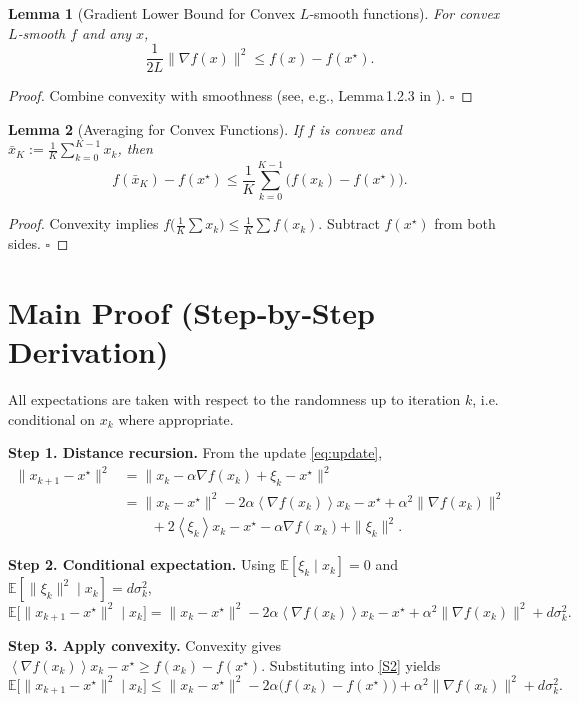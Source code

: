 \documentclass[11pt]{article}
\newtheorem{lemma}{Lemma}
\newcommand{\EE}{\mathbb{E}}
\newcommand{\inner}[1]{\left\langle #1\right\rangle}
\begin{document}
\begin{lemma}[Gradient Lower Bound for Convex $L$‑smooth functions]\label{lem:grad-bound}
For convex $L$‑smooth $f$ and any $x$,
\[
\frac{1}{2L}\|\nabla f(x)\|^{2}\le f(x)-f(x^{\star}).
\tag{L2}
\]
\end{lemma}
\begin{proof}
Combine convexity with smoothness (see, e.g., Lemma 1.2.3 in \cite{Bubeck2015}). \hfill $\square$
\end{proof}

\begin{lemma}[Averaging for Convex Functions]\label{lem:avg-convex}
If $f$ is convex and $\bar{x}_{K}:=\frac{1}{K}\sum_{k=0}^{K-1}x_{k}$, then
\[
f(\bar{x}_{K})-f(x^{\star})\le\frac{1}{K}\sum_{k=0}^{K-1}\bigl(f(x_{k})-f(x^{\star})\bigr).
\tag{L3}
\]
\end{lemma}
\begin{proof}
Convexity implies $f\bigl(\frac{1}{K}\sum x_{k}\bigr)\le\frac{1}{K}\sum f(x_{k})$. Subtract $f(x^{\star})$ from both sides. \hfill $\square$
\end{proof}

\section*{Main Proof (Step‑by‑Step Derivation)}
All expectations are taken with respect to the randomness up to iteration $k$, i.e. conditional on $x_{k}$ where appropriate.

\bigskip
\noindent\textbf{Step 1. Distance recursion.}  
From the update \eqref{eq:update},
\[
\begin{aligned}
\|x_{k+1}-x^{\star}\|^{2}
&=\|x_{k}-\alpha\nabla f(x_{k})+\xi_{k}-x^{\star}\|^{2}\\
&=\|x_{k}-x^{\star}\|^{2}
-2\alpha\inner{\nabla f(x_{k})}{x_{k}-x^{\star}}
+ \alpha^{2}\|\nabla f(x_{k})\|^{2}\\
&\qquad
+2\inner{\xi_{k}}{x_{k}-x^{\star}-\alpha\nabla f(x_{k})}
+\|\xi_{k}\|^{2}. \tag{S1}
\end{aligned}
\]

\noindent\textbf{Step 2. Conditional expectation.}  
Using $\EE[\xi_{k}\mid x_{k}]=0$ and $\EE[\|\xi_{k}\|^{2}\mid x_{k}]=d\sigma_{k}^{2}$,
\[
\EE\!\big[\|x_{k+1}-x^{\star}\|^{2}\mid x_{k}\big]
=
\|x_{k}-x^{\star}\|^{2}
-2\alpha\inner{\nabla f(x_{k})}{x_{k}-x^{\star}}
+ \alpha^{2}\|\nabla f(x_{k})\|^{2}
+d\sigma_{k}^{2}. \tag{S2}
\]

\noindent\textbf{Step 3. Apply convexity.}  
Convexity gives $\inner{\nabla f(x_{k})}{x_{k}-x^{\star}}\ge f(x_{k})-f(x^{\star})$. Substituting into \eqref{S2} yields
\[
\EE\!\big[\|x_{k+1}-x^{\star}\|^{2}\mid x_{k}\big]
\le
\|x_{k}-x^{\star}\|^{2}
-2\alpha\bigl(f(x_{k})-f(x^{\star})\bigr)
+ \alpha^{2}\|\nabla f(x_{k})\|^{2}
+d\sigma_{k}^{2}. \tag{S3}
\]
\end{document}
